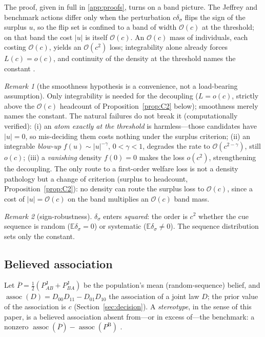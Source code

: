 \documentclass[review,12pt,authoryear]{elsarticle}
\theoremstyle{remark}
\newtheorem{remark}{Remark}
\theoremstyle{definition}
\newcommand{\PB}{P^{\mathrm{B}}}
\newcommand{\PJ}{P^{\mathrm{J}}}
\newcommand{\Pbar}{\overline{P}}
\newcommand{\assoc}{\operatorname{assoc}}
\newcommand{\E}{\mathbb{E}}
\newcommand{\bigO}{\mathcal{O}}
\newcommand{\anchor}[1]{}
\begin{document}
The proof, given in full in \ref{app:proofs}, turns on a band picture. The Jeffrey and benchmark
actions differ only when the perturbation $c\delta_\sigma$ flips the sign of the surplus $u$, so
the flip set is confined to a band of width $\bigO(c)$ at the threshold; on that band the cost
$|u|$ is itself $\bigO(c)$. An $\bigO(c)$ mass of individuals, each costing $\bigO(c)$, yields an
$\bigO(c^{2})$ loss; integrability alone already forces $L(c)=o(c)$, and continuity of the
density at the threshold names the constant \anchor{Thm.~B2}.

\begin{remark}[the smoothness hypothesis is a convenience, not a load-bearing assumption]\label{rem:density}
Only integrability is needed for the decoupling ($L=o(c)$, strictly above the $\bigO(c)$
headcount of Proposition~\ref{prop:C2} below); smoothness merely names the constant. The natural
failures do not break it (computationally verified):
(i) an \emph{atom exactly at the threshold} is harmless---those candidates have $|u|=0$, so
mis-deciding them costs nothing under the surplus criterion;
(ii) an integrable \emph{blow-up} $f(u)\sim|u|^{-\gamma}$, $0<\gamma<1$, degrades the rate to
$\bigO(c^{2-\gamma})$, still $o(c)$;
(iii) a \emph{vanishing} density $f(0)=0$ makes the loss $o(c^2)$, strengthening the decoupling.
The only route to a first-order welfare loss is not a density pathology but a change of
criterion (surplus to headcount, Proposition~\ref{prop:C2}): no density can route the surplus
loss to $\bigO(c)$, since a cost of $|u|=\bigO(c)$ on the band multiplies an $\bigO(c)$ band
mass. \anchor{Thm.~B2}
\end{remark}

\begin{remark}[sign-robustness]\label{rem:sign}
$\delta_\sigma$ enters \emph{squared}: the order is $c^{2}$ whether the cue sequence is random
($\E\delta_\sigma=0$) or systematic ($\E\delta_\sigma\neq0$). The sequence distribution sets
only the constant. \anchor{Thm.~B2}
\end{remark}


\subsection{Believed association}
\label{sec:association}

Let $\Pbar=\tfrac12(\PJ_{AB}+\PJ_{BA})$ be the population's mean (random-sequence) belief, and
$\assoc(D)=D_{00}D_{11}-D_{01}D_{10}$ the association of a joint law $D$; the prior value of the
association is $c$ (Section~\ref{sec:decision}). A \emph{stereotype}, in the sense of this
paper, is a believed association absent from---or in excess of---the benchmark: a nonzero
$\assoc(\Pbar)-\assoc(\PB)$ \anchor{Prop.~C1}.
\end{document}
